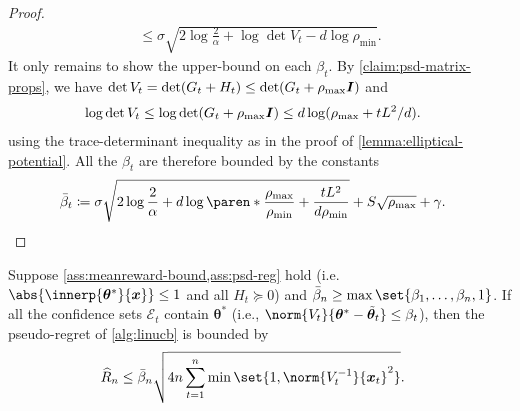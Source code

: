 \documentclass{article}
\renewcommand{\vec}[1]{\bm{#1}}
\newcommand{\defeq}{\coloneq}
\newcommand{\inv}[1]{#1^{-1}}
\renewcommand{\det}{\operatorname{det}}
\DeclarePairedDelimiter{\abs}||
\DeclarePairedDelimiter{\paren}()
\newcommand{\E}{\mathcal{E}}
\newcommand{\Eye}[1][]{\bm{I}\notblank{#1}{_{{#1}\times{#1}}}{}}
\begin{document}
\begin{proof}
\begin{align*}
      \le \sigma\sqrt{2\log\frac{2}{\alpha} + \log\det V_t - d\log\rho_{\min}}.
  \end{align*}
  It only remains to show the upper-bound on each $\beta_t$.  By
  \cref{claim:psd-matrix-props}, we have
  $\det V_t = \det(G_t+H_t) \le \det(G_t+\rho_{\max}\Eye)$ and
  \begin{align*}
    \log\det V_t
    &\le \log\det(G_t + \rho_{\max}\Eye)
    \le d\log(\rho_{\max} + tL^2/d).
  \end{align*}
  using the trace-determinant inequality as in the proof of
  \cref{lemma:elliptical-potential}.  All the $\beta_t$ are therefore
  bounded by the constants
  \begin{align*}
    \bar\beta_t &\defeq \sigma\sqrt{2\log\frac{2}{\alpha} + d\log\paren*{\frac{\rho_{\max}}{\rho_{\min}}
                 + \frac{tL^2}{d\rho_{\min}}}} + S\sqrt{\rho_{\max}} + \gamma. \qedhere
  \end{align*}
\end{proof}

\begin{lemma}\label{lemma:linucb-regret}
  Suppose \cref{ass:meanreward-bound,ass:psd-reg} hold (i.e.\
  $\abs{\innerp{\vec\theta^*}{\vec x}} \le 1$ and all $H_t \succeq 0$)
  and $\bar\beta_n \ge \max\set{\beta_1,\dotsc,\beta_n,1}$.  If all
  the confidence sets $\E_t$ contain $\vec\theta^*$ (i.e.,
  $\norm{V_t}{\vec\theta^* - \tilde{\vec\theta}_t} \le
  \beta_t$), then the pseudo-regret of \cref{alg:linucb} is bounded by
  \begin{align*}
    \widehat{R}_n &\le \bar\beta_n\sqrt{4n \sum_{t=1}^n \min\set{1,
                   \norm{\inv{V_t}}{\vec x_t}^2}}.
  \end{align*}
\end{lemma}
\end{document}
